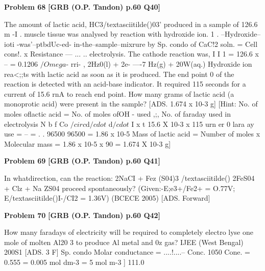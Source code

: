 \begin{problembox}
\textbf{Problem 68} \hfill \textbf{[GRB (O.P. Tandon) p.60 Q40]}
\label{q:ext-grb_all_questions-68}

The amount of lactic acid, HC3/textasciitilde()03' produced in a sample of 
126.6 m -I . 
muscle tissue was analysed by reaction with hydroxide ion. 
1 
. --Hydroxide--ioti -was'--ptbdUc-ed- in-the--sample--mixrure by 
Sp.\underline{\hspace{1cm}} condo of CaC!2 soln. = Cell cons!. x Resistance 
---\underline{\hspace{1cm}} ... \underline{\hspace{1cm}} .. 
electrolysis. The cathode reaction was, 
I 
I 
1 
= 126.6 x -- = 0.1206 $/Omega$- rri-
, 
2Hz0(l) + 2e- ----7 Hz(g) + 20W(aq.) 
Hydroxide ion rea<;;ts with lactic acid as soon as it is produced. 
The end point 
0 of the reaction is detected with an acid-base 
indicator. It required 115 seconds for a current of 15.6 rnA to 
reach end point. How many grams of lactic acid (a monoprotic 
acid) were present in the sample? 
[ADS. 
1.674 x 10-3 g] 
[Hint: No. of moles oflactic acid = No. of moles ofOH - used 
,;, No. of faraday used in 
electrolysis 
N 
b 
f
Co 
$/circ$d$/cdot$ 
d$/cdot$ I x t 
15.6 X 10-3 x 115 
urn er 0 lara ay use = -- = 
. 
. 
96500 
96500 
= 1.86 x 10-5 
Mass of lactic acid = Number of moles x Molecular mass 
= 1.86 x 10-5 x 90 
= 1.674 X 10-3 g]
\end{problembox}

\begin{problembox}
\textbf{Problem 69} \hfill \textbf{[GRB (O.P. Tandon) p.60 Q41]}
\label{q:ext-grb_all_questions-69}

In whatdirection, can the reaction: 
2NaCI + Fez (S04)3 /textasciitilde() 
2FeS04 + Clz + Na ZS04 
proceed spontaneously? 
(Given:-E;e3+/Fe2+ = O.77V; 
E/textasciitilde()I-/CI2 = 1.36V) 
(BCECE 2005) 
[ADS. 
Forward]
\end{problembox}

\begin{problembox}
\textbf{Problem 70} \hfill \textbf{[GRB (O.P. Tandon) p.60 Q42]}
\label{q:ext-grb_all_questions-70}

How many faradays of electricity will be required to 
completely electro lyse one mole of molten Al20 3 to produce 
Al metal and 0z gas? 
IJEE (West Bengal) 200S1 
[ADS. 
3 F] 
Sp. condo 
Molar conductance = ....!....--
Conc. 
1050 
Cone. = 0.555 = 0.005 mol dm-3 = 5 mol m-3 ] 
111.0
\end{problembox}

